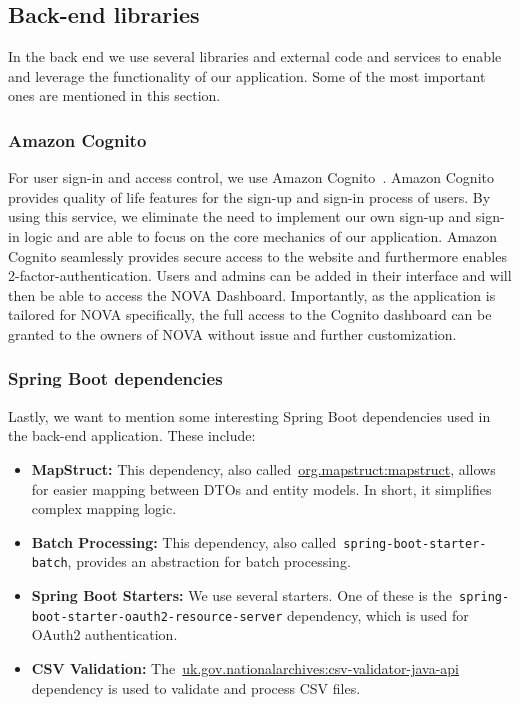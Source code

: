 \subsection{Back-end libraries}\label{subsec:back-end-libraries}

In the back end we use several libraries and external code and services to enable and leverage the functionality of our
application.
Some of the most important ones are mentioned in this section.

\subsubsection{Amazon Cognito}

For user sign-in and access control, we use Amazon Cognito~\cite{cognito2024}.
Amazon Cognito provides quality of life features for the sign-up and sign-in process of users.
By using this service, we eliminate the need to implement our own sign-up and sign-in logic and are able to focus on the
core mechanics of our application.
Amazon Cognito seamlessly provides secure access to the website and furthermore enables 2-factor-authentication.
Users and admins can be added in their interface and will then be able to access the NOVA Dashboard.
Importantly, as the application is tailored for NOVA specifically, the full access to the Cognito dashboard can be
granted to the owners of NOVA without issue and further customization.

\subsubsection{Spring Boot dependencies}

Lastly, we want to mention some interesting Spring Boot dependencies used in the back-end application.
These include:

\begin{itemize}
    \item \textbf{MapStruct:}
    This dependency, also called~\url{org.mapstruct:mapstruct}, allows for easier mapping between DTOs and
    entity models.
    In short, it simplifies complex mapping logic.
    \item \textbf{Batch Processing:}
    This dependency, also called~\texttt{spring-boot-starter-batch}, provides an abstraction for batch processing.
    \item \textbf{Spring Boot Starters:}
    We use several starters.
    One of these is the~\texttt{spring-boot-starter-oauth2-resource-server} dependency, which is used for
    OAuth2 authentication.
    \item \textbf{CSV Validation:}
    The~\url{uk.gov.nationalarchives:csv-validator-java-api} dependency is used to validate and process CSV
    files.
\end{itemize}

